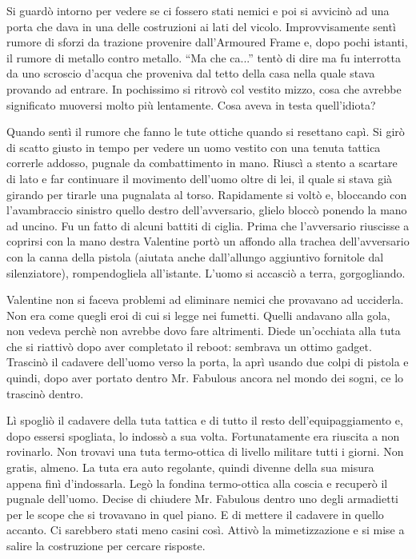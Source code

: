     Si guardò intorno per vedere se ci fossero stati nemici e poi si avvicinò ad una porta che dava in una delle
    costruzioni ai lati del vicolo. Improvvisamente sentì rumore di sforzi da trazione provenire dall'Armoured Frame e,
    dopo pochi istanti, il rumore di metallo contro metallo. ``Ma che ca...'' tentò di dire ma fu interrotta da uno
    scroscio d'acqua che proveniva dal tetto della casa nella quale stava provando ad entrare. In pochissimo si ritrovò
    col vestito mizzo, cosa che avrebbe significato muoversi molto più lentamente. Cosa aveva in testa quell'idiota?

    Quando sentì il rumore che fanno le tute ottiche quando si resettano capì. Si girò di scatto giusto in tempo per
    vedere un uomo vestito con una tenuta tattica correrle addosso, pugnale da combattimento in mano. Riuscì a stento a scartare
    di lato e far continuare il movimento dell'uomo oltre di lei, il quale si stava già girando per tirarle una
    pugnalata al torso. Rapidamente si voltò e, bloccando con l'avambraccio sinistro quello destro dell'avversario,
    glielo bloccò ponendo la mano ad uncino. Fu un fatto di alcuni battiti di ciglia. Prima che l'avversario riuscisse a
    coprirsi con la mano destra Valentine portò un affondo alla trachea dell'avversario con la canna della pistola
    (aiutata anche dall'allungo aggiuntivo fornitole dal silenziatore), rompendogliela all'istante. L'uomo si accasciò a
    terra, gorgogliando.

    Valentine non si faceva problemi ad eliminare nemici che provavano ad ucciderla. Non era come quegli eroi di cui si
    legge nei fumetti. Quelli andavano alla gola, non vedeva perchè non avrebbe dovo fare altrimenti. Diede un'occhiata
    alla tuta che si riattivò dopo aver completato il reboot: sembrava un ottimo gadget. Trascinò il cadavere dell'uomo
    verso la porta, la aprì usando due colpi di pistola e quindi, dopo aver portato dentro Mr. Fabulous ancora nel
    mondo dei sogni, ce lo trascinò dentro.

    Lì spogliò il cadavere della tuta tattica e di tutto il resto dell'equipaggiamento e, dopo essersi spogliata, lo
    indossò a sua volta. Fortunatamente era riuscita a non rovinarlo. Non trovavi una tuta termo-ottica di livello
    militare tutti i giorni. Non gratis, almeno. La tuta era auto regolante, quindi divenne della sua misura appena
    finì d'indossarla. Legò la fondina termo-ottica alla coscia e recuperò il pugnale dell'uomo. Decise di chiudere Mr.
    Fabulous dentro uno degli armadietti per le scope che si trovavano in quel piano. E di mettere il cadavere in quello
    accanto. Ci sarebbero stati meno casini così. Attivò la mimetizzazione e si mise a salire la costruzione per cercare
    risposte.


